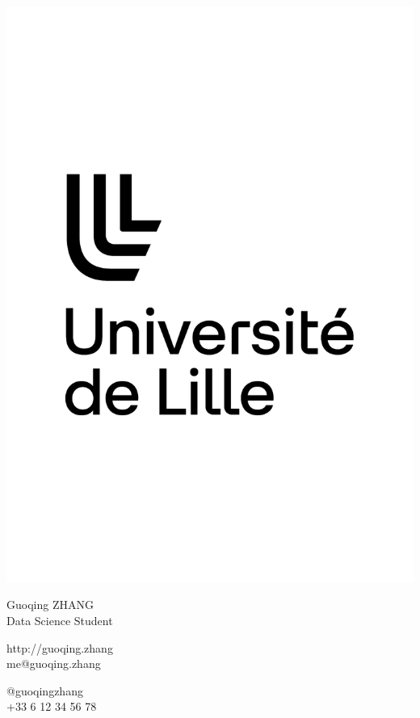 \documentclass{article}
\begin{document}
\centering \includegraphics[width=.25\linewidth]{logo}\\[5pt]
\parbox{2in}{\Large \centering Guoqing ZHANG\\[1pt]
\normalsize Data Science Student}

\vfill
\raggedright
\begin{multicols}{2}
http://guoqing.zhang\\
me@guoqing.zhang

\columnbreak
\raggedleft
@guoqingzhang\\
+33 6 12 34 56 78%
\end{multicols}%
\end{document}
